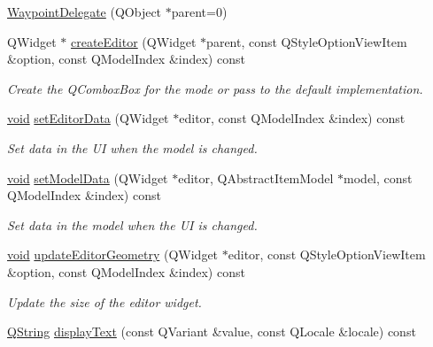 \begin{DoxyCompactItemize}
\item 
\hyperlink{group___path_planner_ga91775a49b804a156874199ff12e57110}{\-Waypoint\-Delegate} (\-Q\-Object $\ast$parent=0)
\item 
\-Q\-Widget $\ast$ \hyperlink{group___path_planner_ga8244740cc7a6bf781698edeebe341d8f}{create\-Editor} (\-Q\-Widget $\ast$parent, const \-Q\-Style\-Option\-View\-Item \&option, const \-Q\-Model\-Index \&index) const 
\begin{DoxyCompactList}\small\item\em \-Create the \-Q\-Combox\-Box for the mode or pass to the default implementation. \end{DoxyCompactList}\item 
\hyperlink{group___u_a_v_objects_plugin_ga444cf2ff3f0ecbe028adce838d373f5c}{void} \hyperlink{group___path_planner_gaea8e4c0fe854e7d0ed69544eef67180a}{set\-Editor\-Data} (\-Q\-Widget $\ast$editor, const \-Q\-Model\-Index \&index) const 
\begin{DoxyCompactList}\small\item\em \-Set data in the \-U\-I when the model is changed. \end{DoxyCompactList}\item 
\hyperlink{group___u_a_v_objects_plugin_ga444cf2ff3f0ecbe028adce838d373f5c}{void} \hyperlink{group___path_planner_gaf22bb7834577da6e336e7a52a563a89a}{set\-Model\-Data} (\-Q\-Widget $\ast$editor, \-Q\-Abstract\-Item\-Model $\ast$model, const \-Q\-Model\-Index \&index) const 
\begin{DoxyCompactList}\small\item\em \-Set data in the model when the \-U\-I is changed. \end{DoxyCompactList}\item 
\hyperlink{group___u_a_v_objects_plugin_ga444cf2ff3f0ecbe028adce838d373f5c}{void} \hyperlink{group___path_planner_ga19057f741d6491a3911c76e747a3479f}{update\-Editor\-Geometry} (\-Q\-Widget $\ast$editor, const \-Q\-Style\-Option\-View\-Item \&option, const \-Q\-Model\-Index \&index) const 
\begin{DoxyCompactList}\small\item\em \-Update the size of the editor widget. \end{DoxyCompactList}\item 
\hyperlink{group___u_a_v_objects_plugin_gab9d252f49c333c94a72f97ce3105a32d}{\-Q\-String} \hyperlink{group___path_planner_ga14243b35579b422c1343085132072746}{display\-Text} (const \-Q\-Variant \&value, const \-Q\-Locale \&locale) const 

\end{DoxyCompactItemize}
